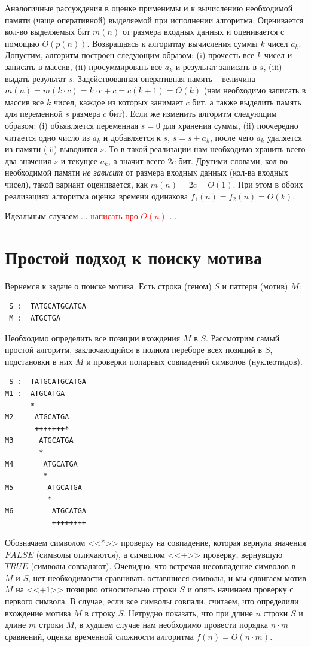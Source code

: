 \documentclass[letterpaper, 11pt]{article}
\begin{document}
Аналогичные рассуждения в оценке применимы и к вычислению необходимой памяти (чаще оперативной) выделяемой
при исполнении алгоритма. Оценивается кол-во выделяемых бит $m(n)$ от размера входных данных и оценивается с помощью
$O(p(n))$. Возвращаясь к алгоритму вычисления суммы $k$ чисел $a_k$. Допустим, алгоритм построен следующим образом: (i) прочесть все $k$ чисел и записать в массив, (ii) просуммировать все $a_k$ и результат записать в $s$, (iii) выдать результат $s$. Задействованная оперативная память -- величина $m(n) = m(k \cdot c) = k \cdot c + c = c(k + 1) = O(k)$ (нам необходимо записать в массив все $k$ чисел, каждое из которых занимает $c$ бит, а также выделить память для переменной $s$ размера $c$ бит). Если же изменить алгоритм следующим образом: (i) объявляется переменная $s = 0$ для хранения суммы, (ii) поочередно читается одно число из $a_k$ и добавляется к $s$, $s = s + a_k$, после чего $a_k$ удаляется из памяти (iii) выводится $s$. То в такой реализации нам необходимо хранить всего два значения $s$ и текущее $a_k$, а значит всего $2c$ бит. Другими словами, кол-во необходимой памяти \textit{не зависит} от размера входных данных (кол-ва входных чисел), такой вариант оценивается, как $m(n) = 2c = O(1)$. При этом в обоих реализациях алгоритма оценка времени одинакова $f_1(n) = f_2(n) = O(k)$.
\par
Идеальным случаем ... \textcolor{red}{написать про $O(n)$} ...
\section{Простой подход к поиску мотива}
\par
Вернемся к задаче о поиске мотива. Есть строка (геном) $S$ и паттерн (мотив) $M$:
\begin{verbatim}
 S :  TATGCATGCATGA
 M :  ATGCTGA
\end{verbatim}
\par
Необходимо определить все позиции вхождения $M$ в $S$. Рассмотрим самый простой алгоритм, заключающийся в полном переборе всех позиций в $S$, подстановки в них $M$ и проверки попарных совпадений символов (нуклеотидов).
\begin{verbatim}
 S :  TATGCATGCATGA
M1 :  ATGCATGA
      * 
M2     ATGCATGA
       +++++++*
M3      ATGCATGA
        *
M4       ATGCATGA
         *
M5        ATGCATGA
          *
M6         ATGCATGA
           ++++++++
\end{verbatim}
\par
Обозначаем символом <<*>> проверку на совпадение, которая вернула значения $FALSE$ (символы отличаются), а символом <<+>> проверку, вернувшую $TRUE$ (символы совпадают). Очевидно, что встречая несовпадение символов в $M$ и $S$, нет необходимости сравнивать оставшиеся символы, и мы сдвигаем мотив $M$ на <<$+1$>> позицию относительно строки $S$ и опять начинаем проверку с первого символа. В случае, если все символы совпали, считаем, что определили вхождение мотива $M$ в строку $S$. Нетрудно показать, что при длине $n$ строки $S$ и длине $m$ строки $M$, в худшем случае нам необходимо провести порядка $n\cdot m$ сравнений, оценка временной сложности алгоритма $f(n) = O(n \cdot m)$.
\end{document}
